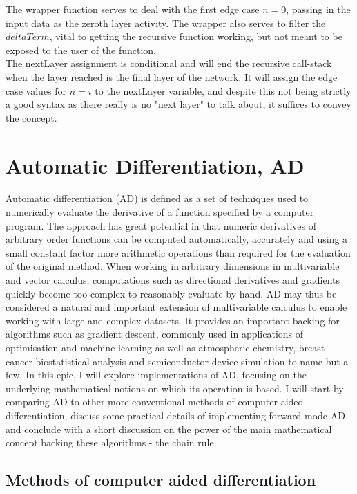 \documentclass[11pt]{article}
\begin{document}
The wrapper function serves to deal with the first edge case $n=0$, passing in the input data as the zeroth layer activity. The wrapper also serves to filter the $deltaTerm$, vital to getting the recursive function working, but not meant to be exposed to the user of the function. \\

The nextLayer assignment is conditional and will end the recursive call-stack when the layer reached is the final layer of the network. It will assign the edge case values for $n = i$ to the nextLayer variable, and despite this not being strictly a good syntax as there really is no "next layer" to talk about, it suffices to convey the concept. \\
 
\section{Automatic Differentiation, AD}

Automatic differentiation (AD) is defined as a set of techniques used to numerically evaluate the derivative of a function specified by a computer program. The approach has great potential in that numeric derivatives of arbitrary order functions can be computed automatically, accurately and using a small constant factor more arithmetic operations than required for the evaluation of the original method. When working in arbitrary dimensions in multivariable and vector calculus, computations such as directional derivatives and gradients quickly become too complex to reasonably evaluate by hand. AD may thus be considered a natural and important extension of multivariable calculus to enable working with large and complex datasets. It provides an important backing for algorithms such as gradient descent, commonly used in applications of optimisation and machine learning as well as atmospheric chemistry, breast cancer biostatistical analysis and semiconductor device simulation to name but a few. In this epic, I will explore implementations of AD, focusing on the underlying mathematical notions on which its operation is based. I will start by comparing AD to other more conventional methods of computer aided differentiation, discuss some practical details of implementing forward mode AD and conclude with a short discussion on the power of the main mathematical concept backing these algorithms - the chain rule.

\subsection{Methods of computer aided differentiation}
\end{document}
